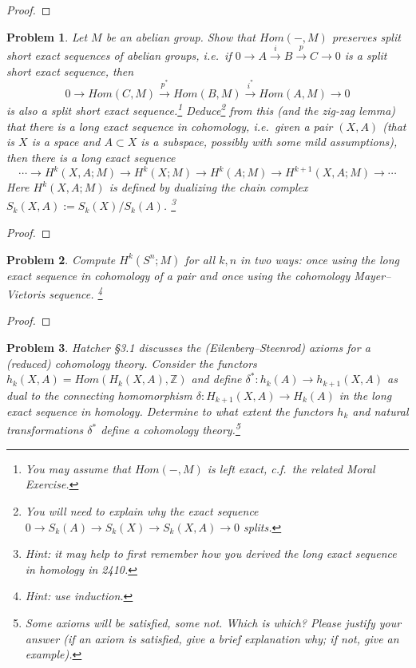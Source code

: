 \documentclass[11pt]{article}
\newtheorem{problem}{Problem}
\begin{document}
\begin{proof}

\end{proof}

\pagebreak



\begin{problem}
Let $M$ be an abelian group. Show that $Hom(-,M)$ preserves split short exact sequences of abelian groups, i.e.\ if $0\rightarrow A\xrightarrow{i}B\xrightarrow{p}C\rightarrow0$ is a split short exact sequence, then 
\[0\rightarrow Hom(C,M)\xrightarrow{p^*} Hom(B,M)\xrightarrow{i^*} Hom(A,M)\rightarrow0\]
is also a split short exact sequence.\footnote{You may assume that $Hom(-,M)$ is left exact, c.f.\ the related Moral Exercise.}  Deduce\footnote{You will need to explain why the exact sequence $0\to S_k(A)\to S_k(X)\to S_k(X,A)\to0$ splits.} from this (and the zig-zag lemma) that there is a long exact sequence in cohomology, i.e.\ given a pair $(X,A)$ (that is $X$ is a space and $A\subset X$ is a subspace, possibly with some mild assumptions), then there is a long exact sequence
\[\cdots\to H^k(X,A;M)\to H^k(X;M)\to H^k(A;M)\to H^{k+1}(X,A;M)\to\cdots\]
Here $H^k(X,A;M)$ is defined by dualizing the chain complex $S_k(X,A):=S_k(X)/S_k(A)$. \footnote{Hint: it may help to first remember how you derived the long exact sequence in homology in 2410.} 
\end{problem} 

\begin{proof}

\end{proof}

\pagebreak

\begin{problem}
Compute $H^k(S^n;M)$ for all $k,n$ in two ways: once using the long exact sequence in cohomology of a pair and once using the cohomology Mayer--Vietoris sequence. \footnote{Hint: use induction.}
\end{problem}

\begin{proof}

\end{proof}

\pagebreak 

\begin{problem}
Hatcher \S3.1 discusses the (Eilenberg--Steenrod) axioms for a (reduced) cohomology theory. Consider the functors $h_k(X,A) = Hom(H_k(X,A), \mathbb Z)$ and define $\delta^*: h_k(A)\to h_{k+1}(X,A)$ as dual to the connecting homomorphism $\delta: H_{k+1}(X,A)\to H_k(A)$ in the long exact sequence in homology. Determine to what extent the functors $h_k$ and natural transformations $\delta^*$ define a cohomology theory.\footnote{Some axioms will be satisfied, some not. Which is which? Please justify your answer (if an axiom is satisfied, give a brief explanation why; if not, give an example).}
\end{problem}
\end{document}
